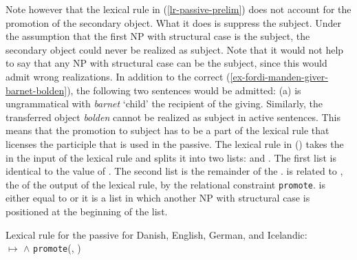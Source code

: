 Note however that the lexical rule in (\ref{lr-passive-prelim}) does not account for the promotion
of the secondary object. What it does is suppress the subject. Under the assumption that the
first NP with structural case is the subject, the secondary object could never be realized as
subject. Note that it would not help to say that any NP with structural case can be the subject, since
this would admit wrong realizations. In addition to the correct
(\ref{ex-fordi-manden-giver-barnet-bolden}), the following two sentences would be admitted: 
\eal
{}
\zl
(a) is ungrammatical with \emph{barnet} `child' the recipient of the giving. Similarly, the
transferred object \emph{bolden} cannot be realized as subject in active sentences. This means that
the promotion to subject has to be a part of the lexical  rule that licenses the participle that is
used in the passive. The lexical rule in () takes the \argstl in the input of the lexical rule and splits it into two
lists:  and . The first list  is identical to the value of \da. The second list  is the
remainder of the \argstl.  is related to , the \argstv of the output of the lexical rule, by the relational constraint
\texttt{promote}.  is either equal to  or it is a list in which another NP with
structural case is positioned at the beginning of the list.

\eas
\label{lr-passive-double-object}
Lexical rule for the passive for Danish, English, German, and Icelandic:\\
 $\mapsto$
 $\wedge$ \texttt{promote}(, )
\zs

